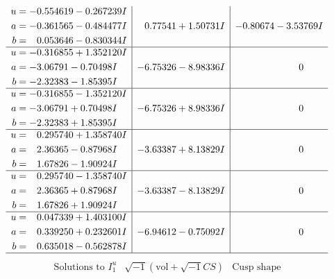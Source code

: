 \documentclass[1p]{elsarticle_modified}
\theoremstyle{definition}
\newcommand{\I}{\sqrt{-1}}
\begin{document}
$$\begin{array}{c|c|c}
\begin{aligned}
u &= -0.554619 - 0.267239 I \\
a &= -0.361565 - 0.484477 I \\
b &= \phantom{-}0.053646 - 0.830344 I\end{aligned}
 & \phantom{-}0.77541 + 1.50731 I & -0.80674 - 3.53769 I \\ \hline\begin{aligned}
u &= -0.316855 + 1.352120 I \\
a &= -3.06791 - 0.70498 I \\
b &= -2.32383 - 1.85395 I\end{aligned}
 & -6.75326 - 8.98336 I & \phantom{-0.000000 } 0 \\ \hline\begin{aligned}
u &= -0.316855 - 1.352120 I \\
a &= -3.06791 + 0.70498 I \\
b &= -2.32383 + 1.85395 I\end{aligned}
 & -6.75326 + 8.98336 I & \phantom{-0.000000 } 0 \\ \hline\begin{aligned}
u &= \phantom{-}0.295740 + 1.358740 I \\
a &= \phantom{-}2.36365 - 0.87968 I \\
b &= \phantom{-}1.67826 - 1.90924 I\end{aligned}
 & -3.63387 + 8.13829 I & \phantom{-0.000000 } 0 \\ \hline\begin{aligned}
u &= \phantom{-}0.295740 - 1.358740 I \\
a &= \phantom{-}2.36365 + 0.87968 I \\
b &= \phantom{-}1.67826 + 1.90924 I\end{aligned}
 & -3.63387 - 8.13829 I & \phantom{-0.000000 } 0 \\ \hline\begin{aligned}
u &= \phantom{-}0.047339 + 1.403100 I \\
a &= \phantom{-}0.339250 + 0.232601 I \\
b &= \phantom{-}0.635018 - 0.562878 I\end{aligned}
 & -6.94612 - 0.75092 I & \phantom{-0.000000 } 0\\
 \hline 
 \end{array}$$\newpage$$\begin{array}{c|c|c}  
\text{Solutions to }I^u_{1}& \I (\text{vol} + \sqrt{-1}CS) & \text{Cusp shape}\\
 \hline 
\begin{aligned}

\end{aligned}
\end{array}$$
\end{document}

